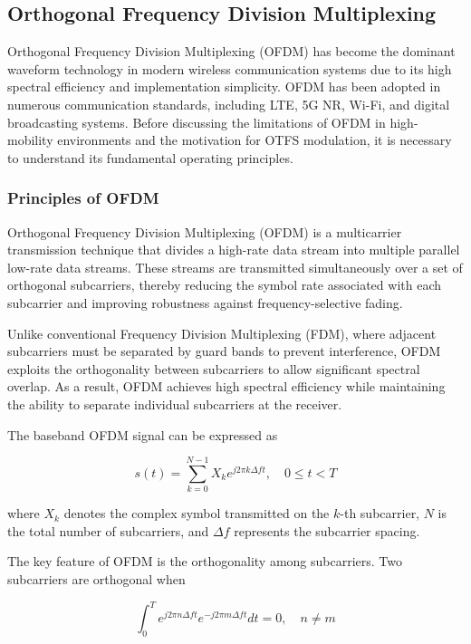 \subsection{Orthogonal Frequency Division Multiplexing}

Orthogonal Frequency Division Multiplexing (OFDM) has become the dominant waveform technology in modern wireless communication systems due to its high spectral efficiency and implementation simplicity. OFDM has been adopted in numerous communication standards, including LTE, 5G NR, Wi-Fi, and digital broadcasting systems. Before discussing the limitations of OFDM in high-mobility environments and the motivation for OTFS modulation, it is necessary to understand its fundamental operating principles.

\subsubsection{Principles of OFDM}

Orthogonal Frequency Division Multiplexing (OFDM) is a multicarrier transmission technique that divides a high-rate data stream into multiple parallel low-rate data streams. These streams are transmitted simultaneously over a set of orthogonal subcarriers, thereby reducing the symbol rate associated with each subcarrier and improving robustness against frequency-selective fading.

Unlike conventional Frequency Division Multiplexing (FDM), where adjacent subcarriers must be separated by guard bands to prevent interference, OFDM exploits the orthogonality between subcarriers to allow significant spectral overlap. As a result, OFDM achieves high spectral efficiency while maintaining the ability to separate individual subcarriers at the receiver.

The baseband OFDM signal can be expressed as

\begin{equation}
s(t)=\sum_{k=0}^{N-1} X_k e^{j2\pi k\Delta f t},
\quad 0 \le t < T
\end{equation}

where \(X_k\) denotes the complex symbol transmitted on the \(k\)-th subcarrier, \(N\) is the total number of subcarriers, and \(\Delta f\) represents the subcarrier spacing.

The key feature of OFDM is the orthogonality among subcarriers. Two subcarriers are orthogonal when

\begin{equation}
\int_{0}^{T}
e^{j2\pi n\Delta f t}
e^{-j2\pi m\Delta f t}
dt
=
0,
\quad n \neq m
\end{equation}

